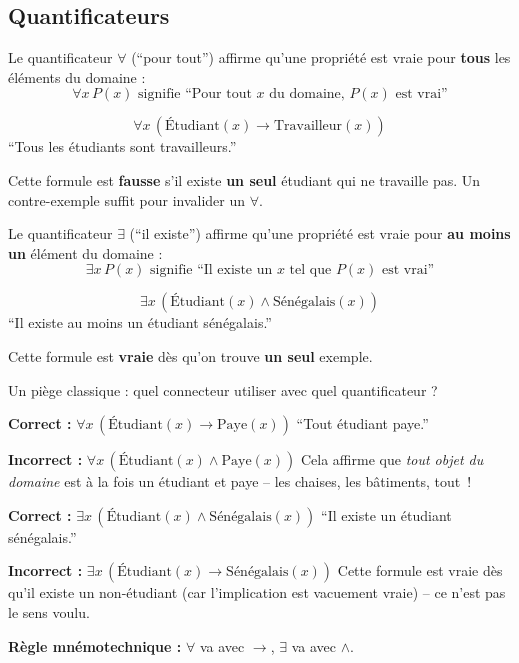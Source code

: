 \documentclass[11pt,a4paper]{article}
\begin{document}
\subsection{Quantificateurs}

\begin{definitionbox}
Le quantificateur $\forall$ (``pour tout'') affirme qu'une propriété est vraie pour \textbf{tous} les éléments du domaine :
$$\forall x \, P(x) \text{ signifie ``Pour tout } x \text{ du domaine, } P(x) \text{ est vrai''}$$
\end{definitionbox}

\begin{exemplebox}
$$\forall x \, (\text{Étudiant}(x) \rightarrow \text{Travailleur}(x))$$
``Tous les étudiants sont travailleurs.''

Cette formule est \textbf{fausse} s'il existe \textbf{un seul} étudiant qui ne travaille pas. Un contre-exemple suffit pour invalider un $\forall$.
\end{exemplebox}

\begin{definitionbox}
Le quantificateur $\exists$ (``il existe'') affirme qu'une propriété est vraie pour \textbf{au moins un} élément du domaine :
$$\exists x \, P(x) \text{ signifie ``Il existe un } x \text{ tel que } P(x) \text{ est vrai''}$$
\end{definitionbox}

\begin{exemplebox}
$$\exists x \, (\text{Étudiant}(x) \land \text{Sénégalais}(x))$$
``Il existe au moins un étudiant sénégalais.''

Cette formule est \textbf{vraie} dès qu'on trouve \textbf{un seul} exemple.
\end{exemplebox}

\begin{attentionbox}
Un piège classique : quel connecteur utiliser avec quel quantificateur ?

\textbf{Correct :} $\forall x \, (\text{Étudiant}(x) \rightarrow \text{Paye}(x))$ \quad ``Tout étudiant paye.''

\textbf{Incorrect :} $\forall x \, (\text{Étudiant}(x) \land \text{Paye}(x))$ \quad Cela affirme que \textit{tout objet du domaine} est à la fois un étudiant et paye -- les chaises, les bâtiments, tout~!

\textbf{Correct :} $\exists x \, (\text{Étudiant}(x) \land \text{Sénégalais}(x))$ \quad ``Il existe un étudiant sénégalais.''

\textbf{Incorrect :} $\exists x \, (\text{Étudiant}(x) \rightarrow \text{Sénégalais}(x))$ \quad Cette formule est vraie dès qu'il existe un non-étudiant (car l'implication est vacuement vraie) -- ce n'est pas le sens voulu.

\textbf{Règle mnémotechnique :} $\forall$ va avec $\rightarrow$, \quad $\exists$ va avec $\land$.
\end{attentionbox}
\end{document}
